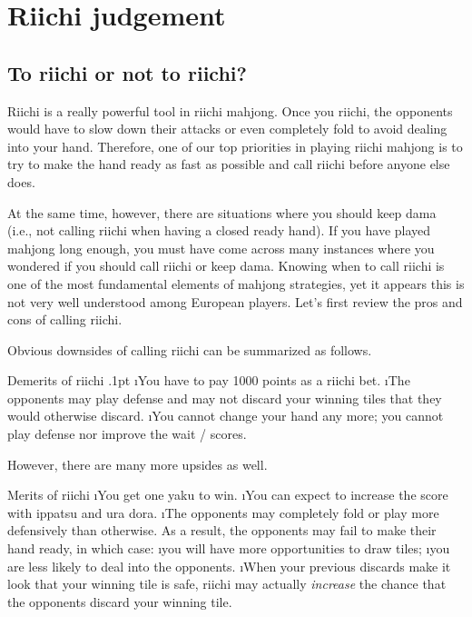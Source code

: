 
\chapter{Riichi judgement} \label{ch:riichi}
\thispagestyle{empty}

\section{To riichi or not to riichi?}
Riichi is a really powerful tool in riichi mahjong. Once you riichi, the opponents would have to slow down their attacks or even completely fold to avoid dealing into your hand. Therefore, one of our top priorities in playing riichi mahjong is to try to make the hand ready as fast as possible and call riichi before anyone else does.

\bigskip
At the same time, however, there are situations where you should keep {\jap dama} (i.e., not calling riichi when having a closed ready hand). If you have played mahjong long enough, you must have come across many instances where you wondered if you should call riichi or keep {\jap dama}. 
Knowing when to call riichi is one of the most fundamental elements of mahjong strategies, yet it appears this is not very well understood among European players. 
Let's first review the pros and cons of calling riichi. 

\bigskip
Obvious downsides of calling riichi can be summarized as follows.
\begin{itembox}[c]{Demerits of riichi}
	\bi \itemsep.1pt
	\i You have to pay 1000 points as a riichi bet.
	\i The opponents may play defense and may not discard your winning tiles that they would otherwise discard.
	\i You cannot change your hand any more; you cannot play defense nor improve the wait / scores.
	\ei
\end{itembox}
However, there are many more upsides as well.


\begin{itembox}[c]{Merits of riichi}
	\bi
	\i You get one {\jap yaku} to win.
	\i You can expect to increase the score with {\jap ippatsu} and {\jap ura dora}.
	\i The opponents may completely fold or play more defensively than otherwise. As a result, the opponents may fail to make their hand ready, in which case:
	\bi
	\i you will have more opportunities to draw tiles; 
	\i you are less likely to deal into the opponents.
	\ei
	\i When your previous discards make it look that your winning tile is safe, riichi may actually \emph{increase} the chance that the opponents discard your winning tile. 
	\ei
\end{itembox}



